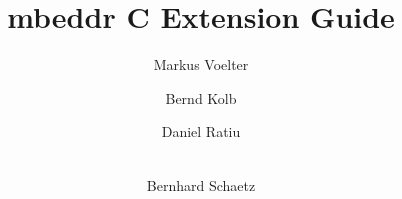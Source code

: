 \documentclass{llncs}
\title{mbeddr C Extension Guide}
\author{Markus Voelter\inst{1} \and Bernd Kolb\inst{1} \and Daniel
Ratiu\inst{2}\and  \\ Bernhard Schaetz\inst{2}}
\institute{itemis AG \and Fortiss GmbH}
\begin{document}
\maketitle

\begin{abstract}
 
\end{abstract} 



% 
%
\end{document}
